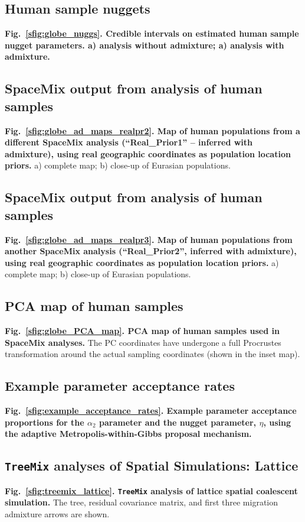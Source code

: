 \documentclass[10pt,letterpaper]{article}
\begin{document}
\subsection*{Human sample nuggets}
\label{globe_nuggs}
{\bf{Fig.\ \ref{sfig:globe_nuggs}. Credible intervals on estimated human sample nugget parameters. a) analysis without admixture; a) analysis with admixture.}}

\subsection*{SpaceMix output from analysis of human samples}
\label{globe_ad_maps_realpr2}
{\bf{Fig.\ \ref{sfig:globe_ad_maps_realpr2}. Map of human populations from a different SpaceMix analysis (``Real\_Prior1'' -- inferred with admixture), using real geographic coordinates as population location priors.}} a) complete map; b) close-up of Eurasian populations.

\subsection*{SpaceMix output from analysis of human samples}
\label{globe_ad_maps_realpr3}
{\bf{Fig.\ \ref{sfig:globe_ad_maps_realpr3}. Map of human populations from another SpaceMix analysis (``Real\_Prior2'',  inferred with admixture), using real geographic coordinates as population location priors.}}  a) complete map; b) close-up of Eurasian populations.

\subsection*{PCA map of human samples}
\label{globe_PCA_map}
{\bf{Fig.\ \ref{sfig:globe_PCA_map}. PCA map of human samples used in SpaceMix analyses.}} The PC coordinates have undergone a full Procrustes transformation around the actual sampling coordinates (shown in the inset map).

\subsection*{Example parameter acceptance rates}
\label{example_acceptance_rates}
{\bf{Fig.\ \ref{sfig:example_acceptance_rates}. Example parameter acceptance proportions for the $\alpha_2$ parameter and the nugget parameter, $\eta$, using the adaptive Metropolis-within-Gibbs proposal mechanism.}}

\subsection*{\texttt{TreeMix} analyses of Spatial Simulations: Lattice}
\label{treemix_lattice}
{\bf{Fig.\ \ref{sfig:treemix_lattice}. \texttt{TreeMix} analysis of lattice spatial coalescent simulation.}}  
The tree, residual covariance matrix, and first three migration admixture arrows are shown.
\end{document}
